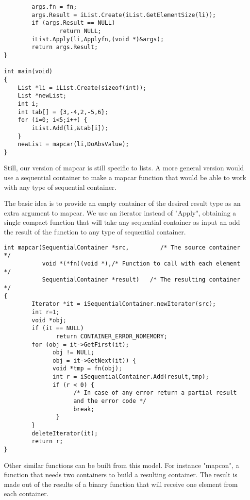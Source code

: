 \documentclass[12pt,a4paper]{memoir} %
\begin{document}
{{\begin{verbatim}
        args.fn = fn;
        args.Result = iList.Create(iList.GetElementSize(li));
        if (args.Result == NULL)
                return NULL;
        iList.Apply(li,Applyfn,(void *)&args);
        return args.Result;
}

int main(void)
{
    List *li = iList.Create(sizeof(int));
    List *newList;
    int i;
    int tab[] = {3,-4,2,-5,6};
    for (i=0; i<5;i++) {
        iList.Add(li,&tab[i]);
    }
    newList = mapcar(li,DoAbsValue);
}
\end{verbatim}
Still, our version of mapcar is still specific to lists. A more general version would use a sequential container to make a mapcar function that would be able to work with any type of sequential container. 

The basic idea is to provide an empty container of the desired result type as an extra argument to mapcar. We use an iterator instead of "Apply", obtaining a single compact function that will take any sequential container as input an add the result of the function to any type of sequential container.
\begin{verbatim}
int mapcar(SequentialContainer *src,         /* The source container */
           void *(*fn)(void *),/* Function to call with each element */
           SequentialContainer *result)   /* The resulting container */
{
        Iterator *it = iSequentialContainer.newIterator(src);
        int r=1;
        void *obj;
        if (it == NULL)
               return CONTAINER_ERROR_NOMEMORY;
        for (obj = it->GetFirst(it);
              obj != NULL;
              obj = it->GetNext(it)) {
              void *tmp = fn(obj);
              int r = iSequentialContainer.Add(result,tmp);
              if (r < 0) {
                    /* In case of any error return a partial result 
                    and the error code */
                    break;
               }
        }
        deleteIterator(it);
        return r;
}
\end{verbatim}
Other similar functions can be built from this model. For instance "mapcon", a function that needs two containers to build a resulting container. The result is  made out of the results of a binary function that will receive one element from each container. 

}}
\end{document}
